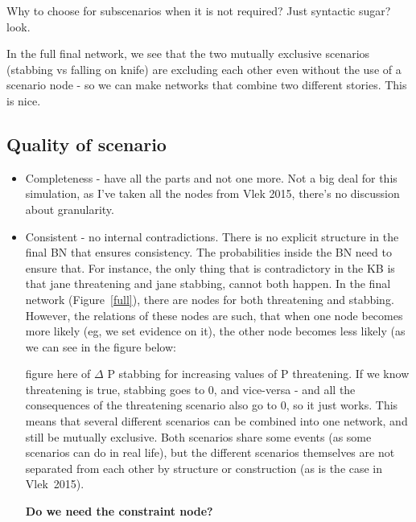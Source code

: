 Why to choose for subscenarios when it is not required? Just syntactic sugar? {\color{red} look}.


In the full final network, we see that the two mutually exclusive scenarios (stabbing vs falling on knife) are excluding each other even without the use of a scenario node - so we can make networks that combine two different stories. This is nice.

\subsection{Quality of scenario}
\begin{itemize}
\item Completeness - have all the parts and not one more. Not a big deal for this simulation, as I've taken all the nodes from Vlek 2015, there's no discussion about granularity.

\item Consistent - no internal contradictions. There is no explicit structure in the final BN that ensures consistency. The probabilities inside the BN need to ensure that. For instance, the only thing that is contradictory in the KB is that jane threatening and jane stabbing, cannot both happen. In the final network (Figure~\ref{full}), there are nodes for both threatening and stabbing. However, the relations of these nodes are such, that when one node becomes more likely (eg, we set evidence on it),  the other node becomes less likely (as we can see in the figure below:

figure here of $\Delta$ P stabbing for increasing values of P threatening. If we know threatening is true, stabbing goes to 0, and vice-versa - and all the consequences of the threatening scenario also go to 0, so it just works. This means that several different scenarios can be combined into one network, and still be mutually exclusive. Both scenarios share some events (as some scenarios can do in real life), but the different scenarios themselves are not separated from each other by structure or construction (as is the case in Vlek~2015).

\textbf{Do we need the constraint node? }


\end{itemize}
